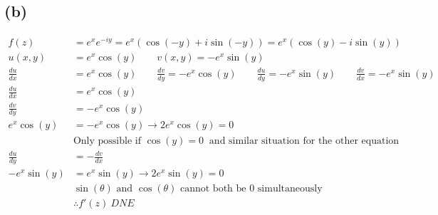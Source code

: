\documentclass{article}
\newcommand{\der}[2]{\frac{d#1}{d#2}}
\begin{document}
\subsection*{(b)}
\begin{align*}
	f (z)         & = e^xe^{-iy} = e^x(\cos{(-y)} +i\sin{(-y)}) = e^x(\cos{(y)} - i\sin{(y)})                                                         \\
	u(x,y)        & = e^x\cos{(y)} \quad \quad v(x,y) = -e^x\sin{(y)}                                                                                 \\
	\der{u}{x}    & = e^x\cos{(y)} \quad \quad \der{v}{y} = -e^x\cos{(y)} \quad\quad \der{u}{y} = -e^x\sin{(y)} \quad\quad \der{v}{x} = -e^x\sin{(y)} \\
	\der{u}{x}    & =  e^x\cos{(y)}                                                                                                                   \\
	\der{v}{y}    & = -e^x\cos{(y)}                                                                                                                   \\
	e^x\cos{(y)}  & = -e^x\cos{(y)} \to 2e^x\cos{(y)} = 0                                                                                             \\
	              & \text{Only possible if }\cos{(y)} = 0\ \text{ and similar situation for the other equation}                                       \\
	\der{u}{y}    & = -\der{v}{x}                                                                                                                     \\
	-e^x\sin{(y)} & = e^x\sin{(y)} \to 2e^x\sin{(y)} = 0                                                                                              \\
	              & \sin{(\theta)}\text{ and }\cos{(\theta)} \text{ cannot both be $0$ simultaneously}                                                \\
	              & \therefore f'(z)\ DNE
\end{align*}
\end{document}
